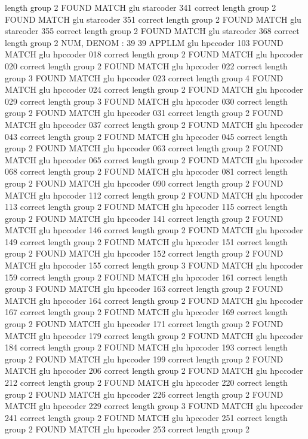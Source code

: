 length group  2
FOUND MATCH glu starcoder 341 correct
length group  2
FOUND MATCH glu starcoder 351 correct
length group  2
FOUND MATCH glu starcoder 355 correct
length group  2
FOUND MATCH glu starcoder 368 correct
length group  2
NUM, DENOM : 39 39
APPLLM glu hpccoder
103
FOUND MATCH glu hpccoder 018 correct
length group  2
FOUND MATCH glu hpccoder 020 correct
length group  2
FOUND MATCH glu hpccoder 022 correct
length group  3
FOUND MATCH glu hpccoder 023 correct
length group  4
FOUND MATCH glu hpccoder 024 correct
length group  2
FOUND MATCH glu hpccoder 029 correct
length group  3
FOUND MATCH glu hpccoder 030 correct
length group  2
FOUND MATCH glu hpccoder 031 correct
length group  2
FOUND MATCH glu hpccoder 037 correct
length group  2
FOUND MATCH glu hpccoder 043 correct
length group  2
FOUND MATCH glu hpccoder 045 correct
length group  2
FOUND MATCH glu hpccoder 063 correct
length group  2
FOUND MATCH glu hpccoder 065 correct
length group  2
FOUND MATCH glu hpccoder 068 correct
length group  2
FOUND MATCH glu hpccoder 081 correct
length group  2
FOUND MATCH glu hpccoder 090 correct
length group  2
FOUND MATCH glu hpccoder 112 correct
length group  2
FOUND MATCH glu hpccoder 113 correct
length group  2
FOUND MATCH glu hpccoder 115 correct
length group  2
FOUND MATCH glu hpccoder 141 correct
length group  2
FOUND MATCH glu hpccoder 146 correct
length group  2
FOUND MATCH glu hpccoder 149 correct
length group  2
FOUND MATCH glu hpccoder 151 correct
length group  2
FOUND MATCH glu hpccoder 152 correct
length group  2
FOUND MATCH glu hpccoder 155 correct
length group  3
FOUND MATCH glu hpccoder 159 correct
length group  2
FOUND MATCH glu hpccoder 161 correct
length group  3
FOUND MATCH glu hpccoder 163 correct
length group  2
FOUND MATCH glu hpccoder 164 correct
length group  2
FOUND MATCH glu hpccoder 167 correct
length group  2
FOUND MATCH glu hpccoder 169 correct
length group  2
FOUND MATCH glu hpccoder 171 correct
length group  2
FOUND MATCH glu hpccoder 179 correct
length group  2
FOUND MATCH glu hpccoder 184 correct
length group  2
FOUND MATCH glu hpccoder 193 correct
length group  2
FOUND MATCH glu hpccoder 199 correct
length group  2
FOUND MATCH glu hpccoder 206 correct
length group  2
FOUND MATCH glu hpccoder 212 correct
length group  2
FOUND MATCH glu hpccoder 220 correct
length group  2
FOUND MATCH glu hpccoder 226 correct
length group  2
FOUND MATCH glu hpccoder 229 correct
length group  3
FOUND MATCH glu hpccoder 241 correct
length group  2
FOUND MATCH glu hpccoder 251 correct
length group  2
FOUND MATCH glu hpccoder 253 correct
length group  2
